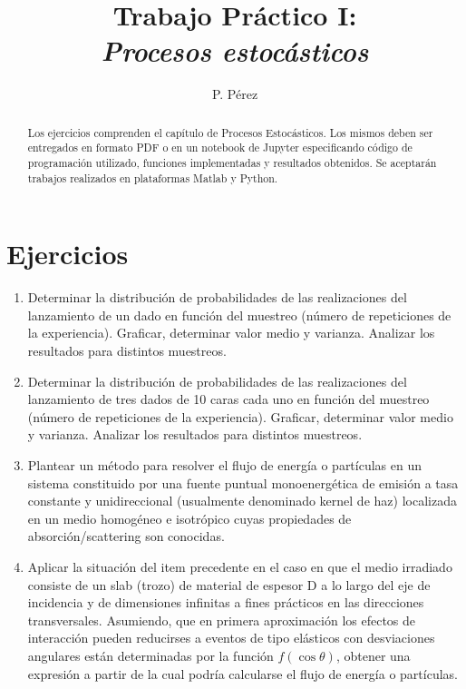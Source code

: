 \documentclass[a4paper,10pt]{article}
\title{{\bf Trabajo Práctico I:}\\ \emph{Procesos estocásticos}}
\author{P. Pérez}
\begin{document}
\maketitle

\begin{abstract}
Los ejercicios comprenden el capítulo de Procesos Estocásticos. Los mismos deben ser entregados en formato PDF o en un notebook de Jupyter especificando código de programación utilizado, funciones implementadas y resultados obtenidos. Se aceptarán trabajos realizados en plataformas Matlab y Python.
\end{abstract}

\section*{Ejercicios}

\begin{enumerate}
 \item  Determinar la distribución de probabilidades de las realizaciones del lanzamiento de un dado en función del muestreo (número de repeticiones de la experiencia). Graficar, determinar valor medio y varianza. Analizar los resultados para distintos muestreos.
 \item Determinar la distribución de probabilidades de las realizaciones del lanzamiento de tres dados de 10 caras cada uno en función del muestreo (número de repeticiones de la experiencia). Graficar, determinar valor medio y varianza. Analizar los resultados para distintos muestreos.
 \item Plantear un método para resolver el flujo de energía o partículas en un sistema constituido por una fuente puntual monoenergética de emisión a tasa constante y unidireccional (usualmente denominado kernel de haz) localizada en un medio homogéneo e isotrópico cuyas propiedades de absorción/scattering son conocidas.
 \item Aplicar la situación del item precedente en el caso en que el medio irradiado consiste de un slab (trozo) de material de espesor D a lo largo del eje de incidencia y de dimensiones infinitas a fines prácticos en las direcciones transversales. Asumiendo, que en primera aproximación los efectos de interacción pueden reducirses a eventos de tipo elásticos con desviaciones angulares están determinadas por la función $f(\cos{\theta})$, obtener una expresión a partir de la cual podría calcularse el flujo de energía o partículas.
 \end{enumerate}
\end{document}
